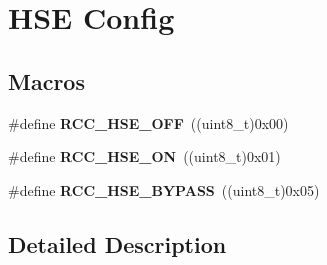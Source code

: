 \hypertarget{group___r_c_c___h_s_e___config}{}\section{H\+SE Config}
\label{group___r_c_c___h_s_e___config}
\subsection*{Macros}
\begin{DoxyCompactItemize}
\item 
\#define {\bfseries R\+C\+C\+\_\+\+H\+S\+E\+\_\+\+O\+FF}~((uint8\+\_\+t)0x00)\hypertarget{group___r_c_c___h_s_e___config_ga1616626d23fbce440398578855df6f97}{}\label{group___r_c_c___h_s_e___config_ga1616626d23fbce440398578855df6f97}

\item 
\#define {\bfseries R\+C\+C\+\_\+\+H\+S\+E\+\_\+\+ON}~((uint8\+\_\+t)0x01)\hypertarget{group___r_c_c___h_s_e___config_gabc4f70a44776c557af20496b04d9a9db}{}\label{group___r_c_c___h_s_e___config_gabc4f70a44776c557af20496b04d9a9db}

\item 
\#define {\bfseries R\+C\+C\+\_\+\+H\+S\+E\+\_\+\+B\+Y\+P\+A\+SS}~((uint8\+\_\+t)0x05)\hypertarget{group___r_c_c___h_s_e___config_ga5ca515db2d5c4d5bdb9ee3d154df2704}{}\label{group___r_c_c___h_s_e___config_ga5ca515db2d5c4d5bdb9ee3d154df2704}

\end{DoxyCompactItemize}


\subsection{Detailed Description}
